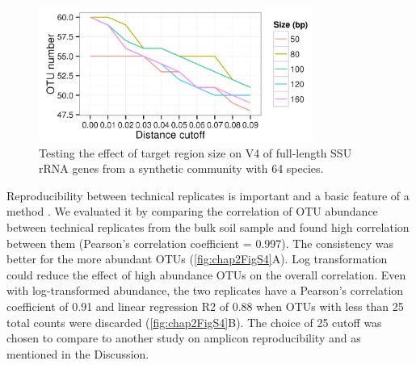 \documentclass[]{msu-thesis}
\begin{document}
\begin{figure}[tbph!]
  \centering
  \includegraphics[width=0.80\textwidth]{figs/chap2_figS3}
  \caption[Testing the effect of target region size on V4 of full-length SSU rRNA genes from a synthetic community]{Testing the effect of target region size on V4 of full-length SSU rRNA genes from a synthetic community with 64 species.}
  \label{fig:chap2FigS3}
\end{figure}


Reproducibility between technical replicates is important and a basic feature of a method \cite{zhou_reproducibility_2011,zhou_high-throughput_2015}. We evaluated it by comparing the correlation of OTU abundance between technical replicates from the bulk soil sample and found high correlation between them (Pearson’s correlation coefficient = 0.997). The consistency was better for the more abundant OTUs (\cref{fig:chap2FigS4}A). Log transformation could reduce the effect of high abundance OTUs on the overall correlation. Even with log-transformed abundance, the two replicates have a Pearson’s correlation coefficient of 0.91 and linear regression R2 of 0.88 when OTUs with less than 25 total counts were discarded (\cref{fig:chap2FigS4}B). The choice of 25 cutoff was chosen to compare to another study on amplicon reproducibility \cite{lundberg_defining_2012} and as mentioned in the Discussion. 
\end{document}
